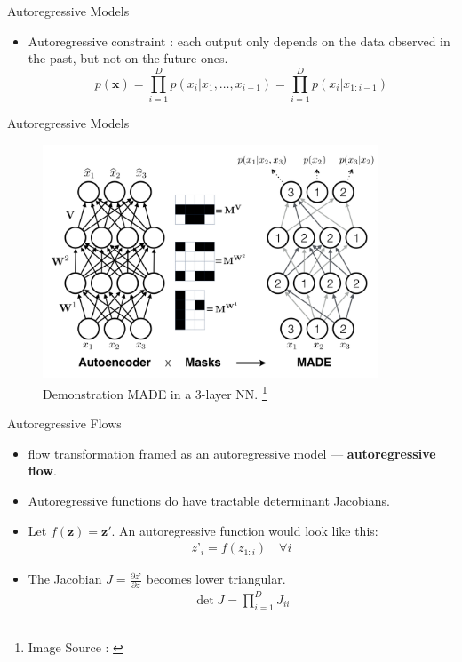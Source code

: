 \documentclass{beamer}
\begin{document}
\begin{frame}{Autoregressive Models}
    \begin{itemize}
        \item Autoregressive constraint : each output only depends on the data observed in the past, but not on the future ones. 
        \pause
        \begin{equation}
            p(\mathbf{x}) = \prod_{i=1}^{D} p(x_i\vert x_1, \dots, x_{i-1}) = \prod_{i=1}^{D} p(x_i\vert x_{1:i-1})
        \end{equation}
    \end{itemize}
\end{frame}
\begin{frame}{Autoregressive Models}

\begin{figure}
    \centering
    \includegraphics[width=100mm, scale=0.7]{MADE.png}
    \caption{Demonstration MADE in a 3-layer NN. \cite{germain2015made}\footnote{Image Source : \cite{germain2015made}}}
    \label{fig:made}
\end{figure}
    
\end{frame}
\begin{frame}{Autoregressive Flows}
\begin{itemize}
    \item flow transformation framed as an autoregressive model — \textbf{autoregressive flow}.
    \pause
    \item Autoregressive functions do have tractable determinant Jacobians.
    \pause
    \item Let $f(\mathbf{z}) = \mathbf{z'}$. An autoregressive function would look like this: 
    \begin{eqnarray}
        z’_i = f(z_{1:i}) \quad \forall i
    \end{eqnarray}
    \pause
    \item The Jacobian $J = \frac{\partial{z’}}{\partial{z}}$ becomes lower triangular.
    \begin{eqnarray}
        \det J = \prod_{i=1}^D J_{ii}
    \end{eqnarray}
\end{itemize}
\end{frame}
\end{document}
